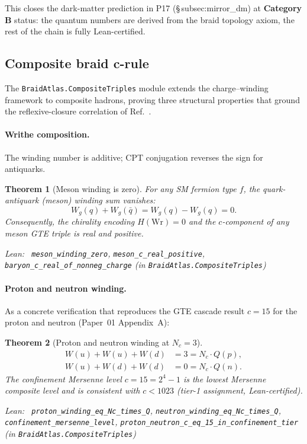 \documentclass[11pt,a4paper]{article}
\newenvironment{leanref}%
  {\par\smallskip\noindent\begingroup\raggedright\textup{Lean:}~}%
  {\par\endgroup}
\newtheorem{theorem}{Theorem}[section]
\theoremstyle{definition}
\begin{document}
This closes the dark-matter prediction in P17 (\S\,subsec:mirror\_dm) at
\textbf{Category B} status: the quantum numbers are derived from the braid
topology axiom, the rest of the chain is fully Lean-certified.

\subsection{Composite braid c-rule}\label{subsec:composite-braids}

The \texttt{BraidAtlas.CompositeTriples} module extends the charge--winding
framework to composite hadrons, proving three structural properties that
ground the reflexive-closure correlation of Ref.~\cite{Spivack2026_Closure24}.

\paragraph{Writhe composition.}
The winding number is additive; CPT conjugation reverses the sign for antiquarks.

\begin{theorem}[Meson winding is zero]\label{thm:meson-winding}
For any SM fermion type $f$, the quark-antiquark (meson) winding sum vanishes:
\[
  W_g(q) + W_g(\bar{q}) = W_g(q) - W_g(q) = 0.
\]
Consequently, the chirality encoding $H(\mathrm{Wr}) = 0$ and the $c$-component
of any meson GTE triple is \emph{real and positive}.

\begin{leanref}
\lstinline|meson_winding_zero|,
\lstinline|meson_c_real_positive|,
\lstinline|baryon_c_real_of_nonneg_charge|
\textup{(in \texttt{BraidAtlas.CompositeTriples})}
\end{leanref}
\end{theorem}

\paragraph{Proton and neutron winding.}
As a concrete verification that reproduces the GTE cascade result $c = 15$
for the proton and neutron (Paper~01 Appendix~A):

\begin{theorem}[Proton and neutron winding at $N_c = 3$]\label{thm:proton-neutron-winding}
\begin{align*}
W(u) + W(u) + W(d) &= 3 = N_c \cdot Q(p), \\
W(u) + W(d) + W(d) &= 0 = N_c \cdot Q(n).
\end{align*}
The confinement Mersenne level $c = 15 = 2^4 - 1$ is the lowest Mersenne composite
level and is consistent with $c < 1023$ (tier-1 assignment, Lean-certified).

\begin{leanref}
\lstinline|proton_winding_eq_Nc_times_Q|,
\lstinline|neutron_winding_eq_Nc_times_Q|,
\lstinline|confinement_mersenne_level|,
\lstinline|proton_neutron_c_eq_15_in_confinement_tier|
\textup{(in \texttt{BraidAtlas.CompositeTriples})}
\end{leanref}
\end{theorem}
\end{document}
